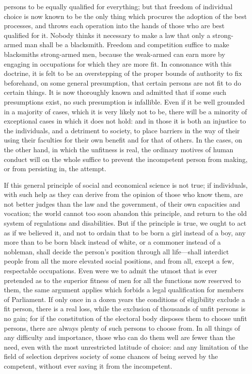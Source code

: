 \documentclass[12pt]{report}
\begin{document}
persons to be equally qualified for everything; but that freedom of individual choice is now known to be the only thing which procures the adoption of the best processes, and throws each operation into the hands of those who are best qualified for it. Nobody thinks it necessary to make a law that only a strong-armed man shall be a blacksmith. Freedom and competition suffice to make blacksmiths strong-armed men, because the weak-armed can earn more by engaging in occupations for which they are more fit. In consonance with this doctrine, it is felt to be an overstepping of the proper bounds of authority to fix beforehand, on some general presumption, that certain persons are not fit to do certain things. It is now thoroughly known and admitted that if some such presumptions exist, no such presumption is infallible. Even if it be well grounded in a majority of cases, which it is very likely not to be, there will be a minority of exceptional cases in which it does not hold: and in those it is both an injustice to the individuals, and a detriment to society, to place barriers in the way of their using their faculties for their own benefit and for that of others. In the cases, on the other hand, in which the unfitness is real, the ordinary motives of human conduct will on the whole suffice to prevent the incompetent person from making, or from persisting in, the attempt.

If this general principle of social and economical science is not true; if individuals, with such help as they can derive from the opinion of those who know them, are not better judges than the law and the government, of their own capacities and vocation; the world cannot too soon abandon this principle, and return to the old system of regulations and disabilities. But if the principle is true, we ought to act as if we believed it, and not to ordain that to be born a girl instead of a boy, any more than to be born black instead of white, or a commoner instead of a nobleman, shall decide the person's position through all life—shall interdict people from all the more elevated social positions, and from all, except a few, respectable occupations. Even were we to admit the utmost that is ever pretended as to the superior fitness of men for all the functions now reserved to them, the same argument applies which forbids a legal qualification for members of Parliament. If only once in a dozen years the conditions of eligibility exclude a fit person, there is a real loss, while the exclusion of thousands of unfit persons is no gain; for if the constitution of the electoral body disposes them to choose unfit persons, there are always plenty of such persons to choose from. In all things of any difficulty and importance, those who can do them well are fewer than the need, even with the most unrestricted latitude of choice: and any limitation of the field of selection deprives society of some chances of being served by the competent, without ever saving it from the incompetent.
\end{document}

